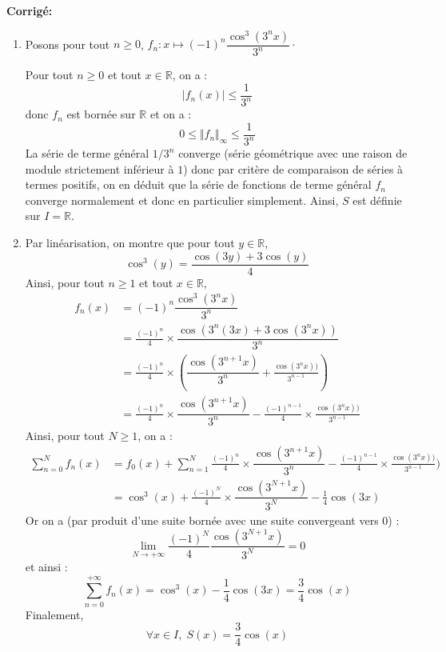 \documentclass[a4paper,twoside,french,11pt]{VcCours}
\newcommand{\corr}{\textbf{Corrigé:}}
\begin{document}
\corr \begin{enumerate}
\item Posons pour tout $n \geq 0$, $f_n : x \mapsto (-1)^n \dfrac{\cos^3(3^nx)}{3^n} \cdot$

\medskip

Pour tout $n \geq 0$ et tout $x \in \mathbb{R}$, on a :
$$ \vert f_n(x) \vert \leq \frac{1}{3^n}$$
donc $f_n$ est bornée sur $\mathbb{R}$ et on a :
$$ 0 \leq \Vert f_n \Vert_{\infty} \leq \frac{1}{3^n}$$
La série de terme général $1/3^n$ converge (série géométrique avec une raison de module strictement inférieur à $1$) donc par critère de comparaison de séries à termes positifs, on en déduit que la série de fonctions de terme général $f_n$ converge normalement et donc en particulier simplement. Ainsi, $S$ est définie sur $I = \mathbb{R}$.
\item Par linéarisation, on montre que pour tout $y \in \mathbb{R}$,
$$ \cos^3(y) = \frac{\cos(3y)+3\cos(y)}{4}$$
Ainsi, pour tout $n \geq 1$ et tout $x \in \mathbb{R}$,
\begin{align*}
f_n(x)& = (-1)^n \dfrac{\cos^3(3^nx)}{3^n} \\
& = \frac{(-1)^n}{4} \times  \dfrac{\cos(3^n(3x)+3\cos(3^nx))}{3^n}  \\
& = \frac{(-1)^n}{4} \times  \left(\dfrac{\cos(3^{n+1} x)}{3^n}+\frac{\cos(3^nx))}{3^{n-1}} \right) \\
& = \frac{(-1)^n}{4} \times\dfrac{\cos(3^{n+1} x)}{3^n}- \frac{(-1)^{n-1}}{4} \times\frac{\cos(3^nx))}{3^{n-1}} 
\end{align*}
Ainsi, pour tout $N \geq 1$, on a :
\begin{align*}
\sum_{n=0}^{N} f_n(x) & = f_0(x) + \sum_{n=1}^{N} \frac{(-1)^n}{4} \times\dfrac{\cos(3^{n+1} x)}{3^n}- \frac{(-1)^{n-1}}{4} \times\frac{\cos(3^nx))}{3^{n-1}})  \\
& = \cos^3(x) + \frac{(-1)^N}{4} \times\dfrac{\cos(3^{N+1} x)}{3^N} - \frac{1}{4} \cos(3x)     
\end{align*}
Or on a (par produit d'une suite bornée avec une suite convergeant vers $0$) :
$$ \lim_{N \rightarrow + \infty} \frac{(-1)^N}{4} \dfrac{\cos(3^{N+1} x)}{3^N} = 0$$
et ainsi :
$$ \sum_{n=0}^{+\infty} f_n(x)  = \cos^3(x) - \frac{1}{4} \cos(3x) = \frac{3}{4} \cos(x)$$
Finalement,
$$\forall x \in I, \; S(x)= \dfrac{3}{4}\cos(x)$$
\end{enumerate}

\medskip
\end{document}
